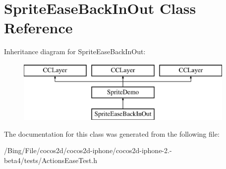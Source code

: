 \hypertarget{interface_sprite_ease_back_in_out}{\section{Sprite\-Ease\-Back\-In\-Out Class Reference}
\label{interface_sprite_ease_back_in_out}
}
Inheritance diagram for Sprite\-Ease\-Back\-In\-Out\-:\begin{figure}[H]
\begin{center}
\leavevmode
\includegraphics[height=3.000000cm]{interface_sprite_ease_back_in_out}
\end{center}
\end{figure}


The documentation for this class was generated from the following file\-:\begin{DoxyCompactItemize}
\item 
/\-Bing/\-File/cocos2d/cocos2d-\/iphone/cocos2d-\/iphone-\/2.-\/beta4/tests/Actions\-Ease\-Test.\-h\end{DoxyCompactItemize}
